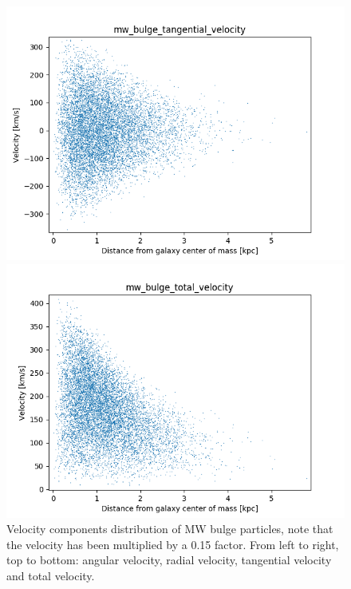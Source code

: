 \documentclass[a4paper,12pt, english]{article}
\begin{document}
\begin{figure}
\begin{minipage}{0.45\textwidth}
\includegraphics[width=1\textwidth]{VelocityDistr/mw_bulge_tangential_velocity.png}
\end{minipage}
\begin{minipage}{0.45\textwidth}
  \centering
\includegraphics[width=1\textwidth]{VelocityDistr/mw_bulge_total_velocity.png}
\end{minipage}
\caption{Velocity components distribution of MW bulge particles, note that the velocity has been multiplied by a 0.15 factor. From left to right, top to bottom: angular velocity, radial velocity, tangential velocity and total velocity.}
\label{fig:bulge-vel}
\end{figure}
\end{document}
